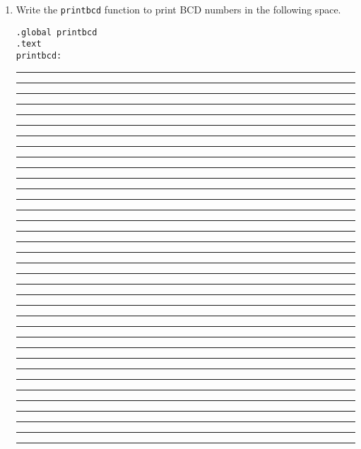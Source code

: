\documentclass[a4paper,10pt]{article}
\begin{document}
\begin{enumerate}
\item Write the \texttt{printbcd} function to print BCD numbers in the following space.
\vspace{5mm}
\begin{large}
\texttt{.global printbcd}\vspace{2mm}\\
\texttt{.text}\vspace{2mm}\\
\texttt{printbcd:}
\end{large}
\vspace{7mm}\hrule\vspace{7mm}\hrule\vspace{7mm}\hrule\vspace{7mm}\hrule
\vspace{7mm}\hrule\vspace{7mm}\hrule\vspace{7mm}\hrule\vspace{7mm}\hrule
\vspace{7mm}\hrule\vspace{7mm}\hrule\vspace{7mm}\hrule\vspace{7mm}\hrule
\vspace{7mm}\hrule\vspace{7mm}\hrule\vspace{7mm}\hrule\vspace{7mm}\hrule
\vspace{7mm}\hrule\vspace{7mm}\hrule\vspace{7mm}\hrule\vspace{7mm}\hrule
\vspace{7mm}\hrule\vspace{7mm}\hrule\vspace{7mm}\hrule\vspace{7mm}\hrule
\vspace{7mm}\hrule\vspace{7mm}\hrule\vspace{7mm}\hrule\vspace{7mm}\hrule
\vspace{7mm}\hrule\vspace{7mm}\hrule\vspace{7mm}\hrule\vspace{7mm}\hrule
\vspace{7mm}\hrule\vspace{7mm}\hrule\vspace{7mm}\hrule\vspace{7mm}\hrule

\end{enumerate}
\end{document}
